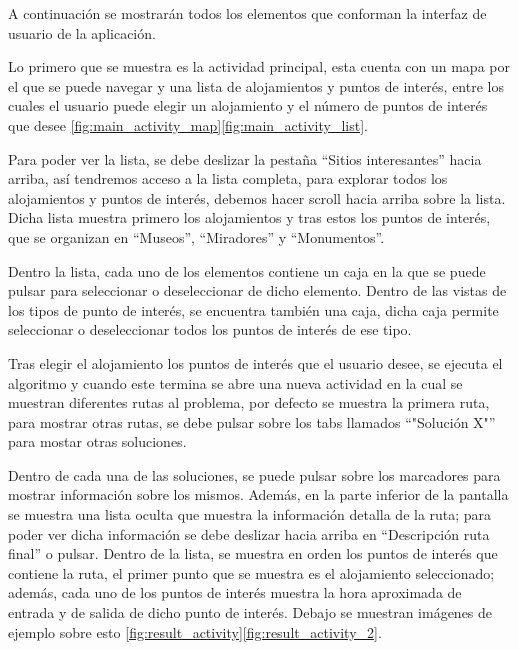 A continuación se mostrarán todos los elementos que conforman la interfaz de usuario de la aplicación.\newline

Lo primero que se muestra es la actividad principal, esta cuenta con un mapa por el que se puede navegar y una lista de alojamientos y puntos de interés, entre los cuales el usuario puede elegir un alojamiento y el número de puntos de interés que desee \ref{fig:main_activity_map}\ref{fig:main_activity_list}.\newline

Para poder ver la lista, se debe deslizar la pestaña \enquote{Sitios interesantes} hacia arriba, así tendremos acceso a la lista completa, para explorar todos los alojamientos y puntos de interés, debemos hacer scroll hacia arriba sobre la lista. Dicha lista muestra primero los alojamientos y tras estos los puntos de interés, que se organizan en \enquote{Museos}, \enquote{Miradores} y \enquote{Monumentos}.\newline

Dentro la lista, cada uno de los elementos contiene un caja en la que se puede pulsar para seleccionar o deseleccionar de dicho elemento. Dentro de las vistas de los tipos de punto de interés, se encuentra también una caja, dicha caja permite seleccionar o deseleccionar todos los puntos de interés de ese tipo.\newline

Tras elegir el alojamiento los puntos de interés que el usuario desee, se ejecuta el algoritmo y cuando este termina se abre una nueva actividad en la cual se muestran diferentes rutas al problema, por defecto se muestra la primera ruta, para mostrar otras rutas, se debe pulsar sobre los tabs llamados \enquote{"Solución X"} para mostar otras soluciones.\newline

Dentro de cada una de las soluciones, se puede pulsar sobre los marcadores para mostrar información sobre los mismos. Además, en la parte inferior de la pantalla se muestra una lista oculta que muestra la información detalla de la ruta; para poder ver dicha información se debe deslizar hacia arriba en \enquote{Descripción ruta final} o pulsar. Dentro de la lista, se muestra en orden los puntos de interés que contiene la ruta, el primer punto que se muestra es el alojamiento seleccionado; además, cada uno de los puntos de interés muestra la hora aproximada de entrada y de salida de dicho punto de interés. Debajo se muestran imágenes de ejemplo sobre esto \ref{fig:result_activity}\ref{fig:result_activity_2}.


